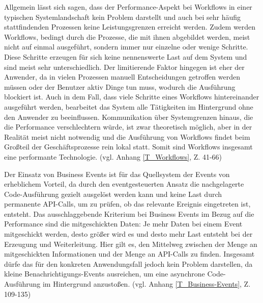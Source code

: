 Allgemein lässt sich sagen, dass der Performance-Aspekt bei Workflows in einer typischen Systemlandschaft kein Problem darstellt und auch bei sehr häufig stattfindenden Prozessen keine Leistungsgrenzen erreicht werden. Zudem werden Workflows, bedingt durch die Prozesse, die mit ihnen abgebildet werden, meist nicht auf einmal ausgeführt, sondern immer nur einzelne oder wenige Schritte. Diese Schritte erzeugen für sich keine nennenswerte Last auf dem System und sind meist sehr unterschiedlich. Der limitierende Faktor hingegen ist eher der Anwender, da in vielen Prozessen manuell Entscheidungen getroffen werden müssen oder der Benutzer aktiv Dinge tun muss, wodurch die Ausführung blockiert ist. Auch in dem Fall, dass viele Schritte eines Workflows hintereinander ausgeführt werden, bearbeitet das System alle Tätigkeiten im Hintergrund ohne den Anwender zu beeinflussen. Kommunikation über Systemgrenzen hinaus, die die Performance verschlechtern würde, ist zwar theoretisch möglich, aber in der Realität meist nicht notwendig und die Ausführung von Workflows findet beim Gro{\ss}teil der Geschäftsprozesse rein lokal statt. Somit sind Workflows insgesamt eine performante Technologie. (vgl. Anhang \ref{T_Workflows}, Z. 41-66)

Der Einsatz von Business Events ist für das Quellsystem der Events von erheblichem Vorteil, da durch den eventgesteuerten Ansatz die nachgelagerte Code-Ausführung gezielt ausgelöst werden kann und keine Last durch permanente API-Calls, um zu prüfen, ob das relevante Ereignis eingetreten ist, entsteht. Das ausschlaggebende Kriterium bei Business Events im Bezug auf die Performance sind die mitgeschickten Daten: Je mehr Daten bei einem Event mitgeschickt werden, desto grö{\ss}er wird es und desto mehr Last entsteht bei der Erzeugung und Weiterleitung. Hier gilt es, den Mittelweg zwischen der Menge an mitgeschickten Informationen und der Menge an API-Calls zu finden. Insgesamt dürfe das für den konkreten Anwendungsfall jedoch kein Problem darstellen, da kleine Benachrichtigungs-Events ausreichen, um eine asynchrone Code-Ausführung im Hintergrund anzusto{\ss}en. (vgl. Anhang \ref{T_Business-Events}, Z. 109-135)

